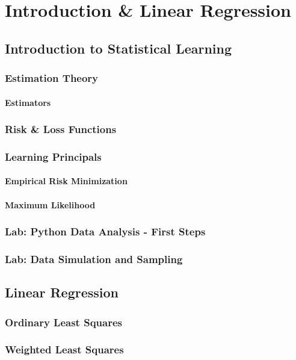 \chapter{Introduction \& Linear Regression}
    \section{Introduction to Statistical Learning}
        \subsection{Estimation Theory}
            \subsubsection{Estimators}
            \subsection{Risk \& Loss Functions}
        \subsection{Learning Principals}
            \subsubsection{Empirical Risk Minimization}
            \subsubsection{Maximum Likelihood}
        \subsection{Lab: Python Data Analysis - First Steps}
        \subsection{Lab: Data Simulation and Sampling}
        
    \section{Linear Regression}
        \subsection{Ordinary Least Squares}
        \subsection{Weighted Least Squares}
